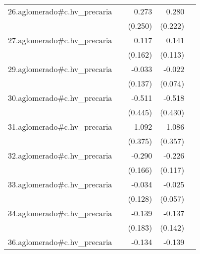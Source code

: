 {\begin{longtable}{l*{4}{D{.}{.}{-1}}}
\addlinespace
26.aglomerado#c.hv\_precaria&                     &       0.273         &       0.280         &                     \\
            &                     &     (0.250)         &     (0.222)         &                     \\
\addlinespace
27.aglomerado#c.hv\_precaria&                     &       0.117         &       0.141         &                     \\
            &                     &     (0.162)         &     (0.113)         &                     \\
\addlinespace
29.aglomerado#c.hv\_precaria&                     &      -0.033         &      -0.022         &                     \\
            &                     &     (0.137)         &     (0.074)         &                     \\
\addlinespace
30.aglomerado#c.hv\_precaria&                     &      -0.511         &      -0.518         &                     \\
            &                     &     (0.445)         &     (0.430)         &                     \\
\addlinespace
31.aglomerado#c.hv\_precaria&                     &      -1.092\sym{**} &      -1.086\sym{**} &                     \\
            &                     &     (0.375)         &     (0.357)         &                     \\
\addlinespace
32.aglomerado#c.hv\_precaria&                     &      -0.290         &      -0.226         &                     \\
            &                     &     (0.166)         &     (0.117)         &                     \\
\addlinespace
33.aglomerado#c.hv\_precaria&                     &      -0.034         &      -0.025         &                     \\
            &                     &     (0.128)         &     (0.057)         &                     \\
\addlinespace
34.aglomerado#c.hv\_precaria&                     &      -0.139         &      -0.137         &                     \\
            &                     &     (0.183)         &     (0.142)         &                     \\
\addlinespace
36.aglomerado#c.hv\_precaria&                     &      -0.134         &      -0.139         &                     \\

\end{longtable}}
